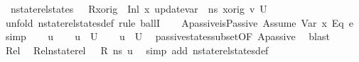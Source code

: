 \begin{isabellebody}
\ {\isacharparenleft}{\kern0pt}\ {\isachardoublequoteopen}nstate{\isacharunderscore}{\kern0pt}rel{\isacharunderscore}{\kern0pt}states\ {\isasymLambda}\ {\isasymLambda}{\isacharprime}{\kern0pt}\ {\isacharparenleft}{\kern0pt}R{\isacharparenleft}{\kern0pt}x{\isacharunderscore}{\kern0pt}orig\ {\isasymmapsto}\ {\isacharparenleft}{\kern0pt}Inl\ x{\isacharparenright}{\kern0pt}{\isacharparenright}{\kern0pt}{\isacharparenright}{\kern0pt}\ {\isacharparenleft}{\kern0pt}update{\isacharunderscore}{\kern0pt}var\ {\isasymLambda}\ ns\ x{\isacharunderscore}{\kern0pt}orig\ v{\isacharparenright}{\kern0pt}\ {\isacharquery}{\kern0pt}U{\isacharprime}{\kern0pt}{\isachardoublequoteclose}{\isacharparenright}{\kern0pt}\isanewline
%
\isadelimproof
%
\endisadelimproof
%
\isatagproof
{}\isamarkupfalse%
\ {\isacharparenleft}{\kern0pt}unfold\ nstate{\isacharunderscore}{\kern0pt}rel{\isacharunderscore}{\kern0pt}states{\isacharunderscore}{\kern0pt}def{\isacharcomma}{\kern0pt}\ rule\ ballI{\isacharparenright}{\kern0pt}\isanewline
\ \ \isamarkupfalse%
\ Apassive{\isacharcolon}{\kern0pt}{\isachardoublequoteopen}isPassive\ {\isacharparenleft}{\kern0pt}Assume\ {\isacharparenleft}{\kern0pt}{\isacharparenleft}{\kern0pt}Var\ x{\isacharparenright}{\kern0pt}\ {\isasymguillemotleft}Eq{\isasymguillemotright}\ e{}{\isacharparenright}{\kern0pt}{\isacharparenright}{\kern0pt}{\isachardoublequoteclose}\ \isamarkupfalse%
\ simp\isanewline
\ \ \isamarkupfalse%
\ u{\isacharprime}{\kern0pt}\isanewline
\ \ \isamarkupfalse%
\ {\isachardoublequoteopen}u{\isacharprime}{\kern0pt}\ {\isasymin}\ {\isacharquery}{\kern0pt}U{\isacharprime}{\kern0pt}{\isachardoublequoteclose}\isanewline
\ \ \isamarkupfalse%
\ {\isachardoublequoteopen}u{\isacharprime}{\kern0pt}\ {\isasymin}\ U{\isachardoublequoteclose}\ \isamarkupfalse%
\ passive{\isacharunderscore}{\kern0pt}states{\isacharunderscore}{\kern0pt}subset{\isacharbrackleft}{\kern0pt}OF\ Apassive{\isacharbrackright}{\kern0pt}\ \isamarkupfalse%
\ blast\isanewline
\ \ \isamarkupfalse%
\ Rel\ \isamarkupfalse%
\ Rel{}{\isacharcolon}{\kern0pt}{\isachardoublequoteopen}nstate{\isacharunderscore}{\kern0pt}rel\ {\isasymLambda}\ {\isasymLambda}{\isacharprime}{\kern0pt}\ R\ ns\ u{\isacharprime}{\kern0pt}{\isachardoublequoteclose}\ \isamarkupfalse%
\ {\isacharparenleft}{\kern0pt}simp\ add{\isacharcolon}{\kern0pt}\ nstate{\isacharunderscore}{\kern0pt}rel{\isacharunderscore}{\kern0pt}states{\isacharunderscore}{\kern0pt}def{\isacharparenright}{\kern0pt}\isanewline

\end{isabellebody}
